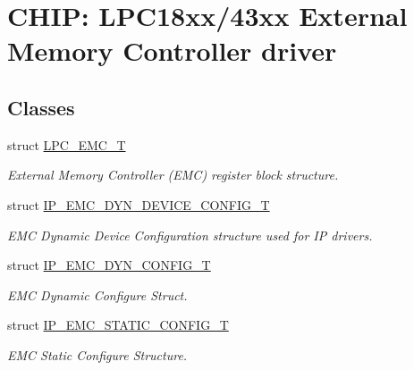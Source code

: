 \hypertarget{group___e_m_c__18_x_x__43_x_x}{}\section{C\+H\+IP\+: L\+P\+C18xx/43xx External Memory Controller driver}
\label{group___e_m_c__18_x_x__43_x_x}
\subsection*{Classes}
\begin{DoxyCompactItemize}
\item 
struct \hyperlink{struct_l_p_c___e_m_c___t}{L\+P\+C\+\_\+\+E\+M\+C\+\_\+T}
\begin{DoxyCompactList}\small\item\em External Memory Controller (E\+MC) register block structure. \end{DoxyCompactList}\item 
struct \hyperlink{struct_i_p___e_m_c___d_y_n___d_e_v_i_c_e___c_o_n_f_i_g___t}{I\+P\+\_\+\+E\+M\+C\+\_\+\+D\+Y\+N\+\_\+\+D\+E\+V\+I\+C\+E\+\_\+\+C\+O\+N\+F\+I\+G\+\_\+T}
\begin{DoxyCompactList}\small\item\em E\+MC Dynamic Device Configuration structure used for IP drivers. \end{DoxyCompactList}\item 
struct \hyperlink{struct_i_p___e_m_c___d_y_n___c_o_n_f_i_g___t}{I\+P\+\_\+\+E\+M\+C\+\_\+\+D\+Y\+N\+\_\+\+C\+O\+N\+F\+I\+G\+\_\+T}
\begin{DoxyCompactList}\small\item\em E\+MC Dynamic Configure Struct. \end{DoxyCompactList}\item 
struct \hyperlink{struct_i_p___e_m_c___s_t_a_t_i_c___c_o_n_f_i_g___t}{I\+P\+\_\+\+E\+M\+C\+\_\+\+S\+T\+A\+T\+I\+C\+\_\+\+C\+O\+N\+F\+I\+G\+\_\+T}
\begin{DoxyCompactList}\small\item\em E\+MC Static Configure Structure. \end{DoxyCompactList}\end{DoxyCompactItemize}
